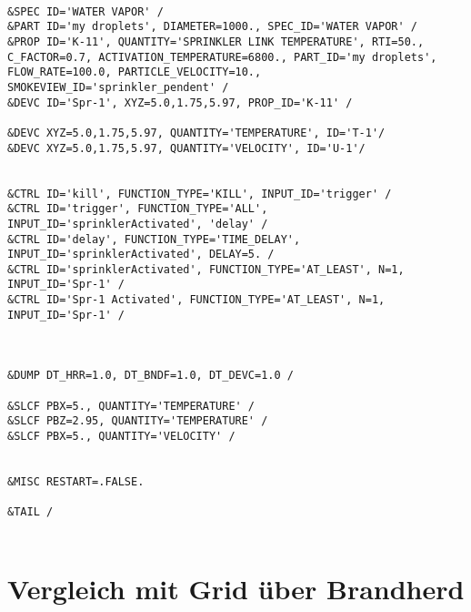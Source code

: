 \begin{lstlisting}[emptylines=0,basicstyle=\tiny]
 
&SPEC ID='WATER VAPOR' /
&PART ID='my droplets', DIAMETER=1000., SPEC_ID='WATER VAPOR' /
&PROP ID='K-11', QUANTITY='SPRINKLER LINK TEMPERATURE', RTI=50., C_FACTOR=0.7, ACTIVATION_TEMPERATURE=6800., PART_ID='my droplets', FLOW_RATE=100.0, PARTICLE_VELOCITY=10., SMOKEVIEW_ID='sprinkler_pendent' /
&DEVC ID='Spr-1', XYZ=5.0,1.75,5.97, PROP_ID='K-11' /

&DEVC XYZ=5.0,1.75,5.97, QUANTITY='TEMPERATURE', ID='T-1'/
&DEVC XYZ=5.0,1.75,5.97, QUANTITY='VELOCITY', ID='U-1'/


&CTRL ID='kill', FUNCTION_TYPE='KILL', INPUT_ID='trigger' /
&CTRL ID='trigger', FUNCTION_TYPE='ALL', INPUT_ID='sprinklerActivated', 'delay' /
&CTRL ID='delay', FUNCTION_TYPE='TIME_DELAY', INPUT_ID='sprinklerActivated', DELAY=5. /
&CTRL ID='sprinklerActivated', FUNCTION_TYPE='AT_LEAST', N=1, INPUT_ID='Spr-1' /
&CTRL ID='Spr-1 Activated', FUNCTION_TYPE='AT_LEAST', N=1, INPUT_ID='Spr-1' /



&DUMP DT_HRR=1.0, DT_BNDF=1.0, DT_DEVC=1.0 /

&SLCF PBX=5., QUANTITY='TEMPERATURE' /
&SLCF PBZ=2.95, QUANTITY='TEMPERATURE' /
&SLCF PBX=5., QUANTITY='VELOCITY' /


&MISC RESTART=.FALSE.

&TAIL /


\end{lstlisting}

\section{Vergleich mit Grid über Brandherd}
